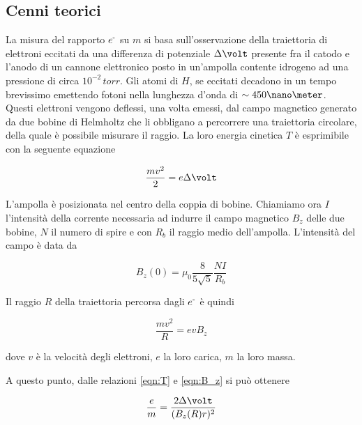 \subsection{Cenni teorici}

La misura del rapporto $e^{\textrm{-}}$ su $m$ si basa sull'osservazione della traiettoria di elettroni eccitati da una differenza di potenziale $\Delta\volt$ presente fra il catodo e l'anodo di un cannone elettronico posto in un'ampolla contente idrogeno ad una pressione di circa $10^{-2}\,torr$.
Gli atomi di $H$, se eccitati decadono in un tempo brevissimo emettendo fotoni nella lunghezza d'onda di $\sim 450\nano\meter$.
Questi elettroni vengono deflessi, una volta emessi, dal campo magnetico generato da due bobine di Helmholtz che li obbligano a percorrere una traiettoria circolare, della quale è possibile misurare il raggio.
La loro energia cinetica $T$ è esprimibile con la seguente equazione
\begin{center}
	\begin{equation} \label{eqn:T}
	\frac{mv^2}{2}=e\Delta\volt
	\end{equation}
\end{center}

L'ampolla è posizionata nel centro della coppia di bobine.
Chiamiamo ora $I$ l'intensità della corrente necessaria ad indurre il campo magnetico $B_z$ delle due bobine, $N$ il numero di spire e con $R_b$ il raggio medio dell'ampolla.
L'intensità del campo è data da 
\begin{center}
	\begin{equation*}
	B_z(0)=\mu_0\frac{8}{5\sqrt5}\frac{NI}{R_b}
	\end{equation*}
\end{center}

Il raggio $R$ della traiettoria percorsa dagli $e^{\textrm{-}}$ è quindi

\begin{center}
	\begin{equation} \label{eqn:B_z}
	\frac{mv^2}{R} = evB_z
	\end{equation}
\end{center}
dove $v$ è la velocità degli elettroni, $e$ la loro carica, $m$ la loro massa.

A questo punto, dalle relazioni \ref{eqn:T} e \ref{eqn:B_z} si può ottenere
\begin{center}
	\begin{equation}\label{eqn:em}
	\frac{e}{m}=\frac{2\Delta\volt}{(B_z(R)r)^2}
	\end{equation}
\end{center}

